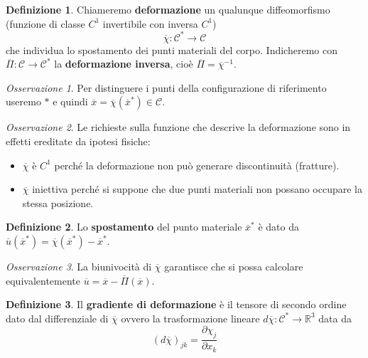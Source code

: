 \documentclass{book}
\theoremstyle{plain}
\theoremstyle{plain}
\theoremstyle{plain}
\theoremstyle{plain}
\theoremstyle{plain}
\theoremstyle{definition}
\newtheorem{defi}{Definizione}[chapter]
\theoremstyle{remark}
\newtheorem*{oss}{Osservazione}
\theoremstyle{definition}
\begin{document}
\begin{defi}
    Chiameremo \textbf{deformazione} un qualunque diffeomorfismo (funzione di classe $C^1$ invertibile con inversa $C^1$)
    \begin{displaymath}
        \overline{\chi}: \mathcal{C}^*\to \mathcal{C}
    \end{displaymath}
    che individua lo spostamento dei punti materiali del corpo. Indicheremo con $\overline{\Pi}: \mathcal{C}\to\mathcal{C}^*$ la \textbf{deformazione inversa}, cioè $\overline{\Pi}=\overline{\chi}^{-1}$.
\end{defi}

\begin{oss}
    Per distinguere i punti della configurazione di riferimento useremo $*$ e quindi $\overline{x}=\overline{\chi}(\overline{x}^*) \in \mathcal{C}$.
\end{oss}

\begin{oss}
     Le richieste sulla funzione che descrive la deformazione sono in effetti ereditate da ipotesi fisiche:
     \begin{itemize}
         \item $\overline{\chi}$ è $C^1$ perché la deformazione non può generare discontinuità (fratture).
         \item $\overline{\chi}$ iniettiva perché si suppone che due punti materiali non possano occupare la stessa posizione.
     \end{itemize}
\end{oss}

\begin{defi}
    Lo \textbf{spostamento} del punto materiale $\overline{x}^*$ è dato da $\overline{u}(\overline{x}^*)=\overline{\chi}(\overline{x}^*)-\overline{x}^*$.
\end{defi}

\begin{oss}
    La biunivocità di $\overline{\chi}$ garantisce che si possa calcolare equivalentemente $\overline{u}=\overline{x}-\overline{\Pi}(\overline{x})$.
\end{oss}

\begin{defi}
    Il \textbf{gradiente di deformazione} è il tensore di secondo ordine dato dal differenziale di $\overline{\chi}$ ovvero la trasformazione lineare $d\overline{\chi}:\mathcal{C}^*\to\mathbb{R}^3 $ data da
    \begin{displaymath}
        (d\overline{\chi})_{jk}=\frac{\partial\chi_j}{\partial x_k}
    \end{displaymath}
\end{defi}
\end{document}
